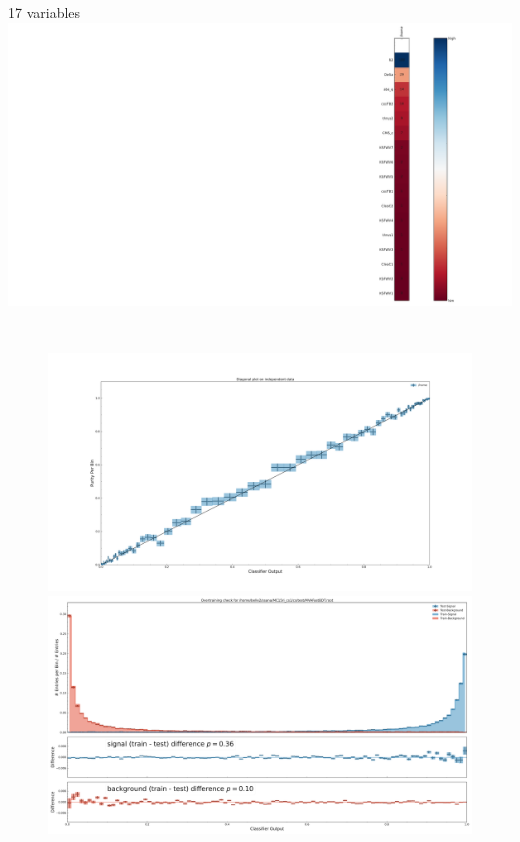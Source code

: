 \documentclass[12pt]{beamer}
\begin{document}
\begin{frame}{17 variables}
\hspace{-1in}
\includegraphics[width=1.25\textwidth]{evaluate_17/importance.pdf}
	\vspace{-3.3in}
	\begin{columns}
		\begin{figure}
			\includegraphics[width=1.0\textwidth]{evaluate_17/diagonal_plot_test.pdf}
			\includegraphics[width=1.0\textwidth]{evaluate_17/overtraining_plot_-936217630058450507.pdf}
		\end{figure}
		
	\end{columns}
\end{frame}
\end{document}

